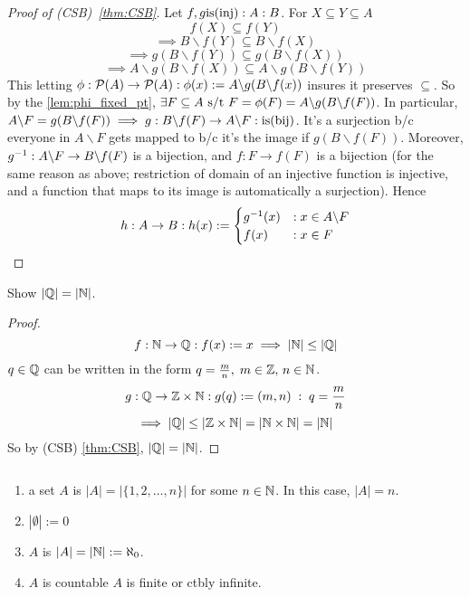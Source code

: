\documentclass[12pt]{article}
\begin{document}

\bboxproof
\begin{proof}[Proof of (CSB)~\cref{thm:CSB}]
  Let \(f,g\mathrm{is}(\mathrm{inj}):A:B\). For \(X\subseteq Y\subseteq A\)
\[f(X)\subseteq f(Y)\]
\[\implies B\backslash f(Y)\subseteq B\backslash f(X)\]
\[\implies g(B\backslash f(Y))\subseteq g(B\backslash f(X))\]
\[\implies A\backslash g(B\backslash f(X))\subseteq A\backslash g(B\backslash f(Y))\]
This letting \(\phi:\mathcal P(A)\to\mathcal P(A):\phi(x):=A\backslash g(B\backslash f(x))\)
insures it preserves \(\subseteq\).
So by the \cref{lem:phi_fixed_pt}, \(\exists F\subseteq A
\text{ s/t } F=\phi(F)=A\backslash g(B\backslash f(F))\). In particular, \(A
\backslash F=g(B\backslash f(F))\implies g:B\backslash f(F)\to A\backslash F
:\mathrm{is}(\mathrm{bij})\).
\bboxnote
{} It's a surjection b/c everyone in \(A\backslash F\) gets mapped to
b/c it's the image if \(g(B\backslash f(F))\).
\ebox
Moreover, \(g^{-1}:A\backslash F\to B\backslash f(F)\) is a bijection, and
\(f:F\to f(F)\) is a bijection (for the same reason as above; restriction of
domain of an injective function is injective, and a function that maps to its image is
automatically a surjection). Hence
\begin{equation*}
  h:A\to B:h(x):=
  \begin{cases}
    g^{-1}(x) &:x\in A\backslash F\\
    f(x) &:x\in F
  \end{cases}
\end{equation*}
\end{proof}
\ebox

\bboxex
Show \(|\mathbb Q|=|\mathbb N|\).
\bboxproof
\begin{proof}
  \[f:\mathbb N\to\mathbb Q:f(x):=x\implies|\mathbb N|\le|\mathbb Q|\]
  \(q\in\mathbb Q\) can be written in the form \(q=\frac m n,\;m\in\mathbb Z,\,n\in\mathbb N\).
  \[g:\mathbb Q\to\mathbb Z\times\mathbb N:g(q):=(m,n)\;:\;q=\frac m n\]
  \[\implies|\mathbb Q|\le|\mathbb Z\times\mathbb N|=|\mathbb N\times\mathbb N|=|\mathbb N|\]
  So by (CSB) \cref{thm:CSB}, \(|\mathbb Q|=|\mathbb N|\).
\end{proof}
\ebox
\ebox


\bbox
\begin{defn}
  \(\,\)\begin{enumerate}
    \item a set \(A\) is   \(|A|=|\{1,2,\dots,n\}|\)
      for some \(n\in\mathbb N\). In this case, \(|A|=n\).
    \item \(|\emptyset|:=0\)
    \item \(A\) is   
      \(|A|=|\mathbb N|:=\aleph_0\).
    \item \(A\) is countable  \(A\) is finite or ctbly infinite.
  \end{enumerate}
\end{defn}
\ebox
\end{document}
